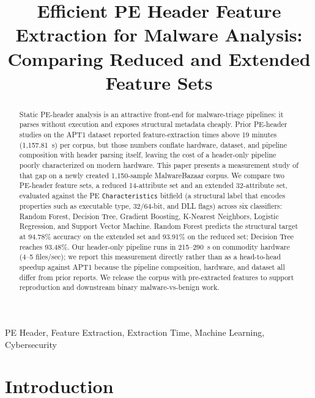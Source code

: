 \documentclass[conference,a4paper]{IEEEtran}
\begin{document}
\title{Efficient PE Header Feature Extraction for Malware Analysis: Comparing Reduced and Extended Feature Sets}

\author{
}

\maketitle

\begin{abstract}
Static PE-header analysis is an attractive front-end for malware-triage pipelines: it parses without execution and exposes structural metadata cheaply. Prior PE-header studies on the APT1 dataset reported feature-extraction times above 19 minutes (1{,}157.81~s) per corpus, but those numbers conflate hardware, dataset, and pipeline composition with header parsing itself, leaving the cost of a header-only pipeline poorly characterized on modern hardware. This paper presents a measurement study of that gap on a newly created 1{,}150-sample MalwareBazaar corpus. We compare two PE-header feature sets, a reduced 14-attribute set and an extended 32-attribute set, evaluated against the PE \texttt{Characteristics} bitfield (a structural label that encodes properties such as executable type, 32/64-bit, and DLL flags) across six classifiers: Random Forest, Decision Tree, Gradient Boosting, K-Nearest Neighbors, Logistic Regression, and Support Vector Machine. Random Forest predicts the structural target at 94.78\% accuracy on the extended set and 93.91\% on the reduced set; Decision Tree reaches 93.48\%. Our header-only pipeline runs in 215--290~s on commodity hardware (4--5 files/sec); we report this measurement directly rather than as a head-to-head speedup against APT1 because the pipeline composition, hardware, and dataset all differ from prior reports. We release the corpus with pre-extracted features to support reproduction and downstream binary malware-vs-benign work.
\end{abstract}

\begin{IEEEkeywords}
PE Header, Feature Extraction, Extraction Time, Machine Learning, Cybersecurity
\end{IEEEkeywords}

\section{Introduction}
\end{document}

